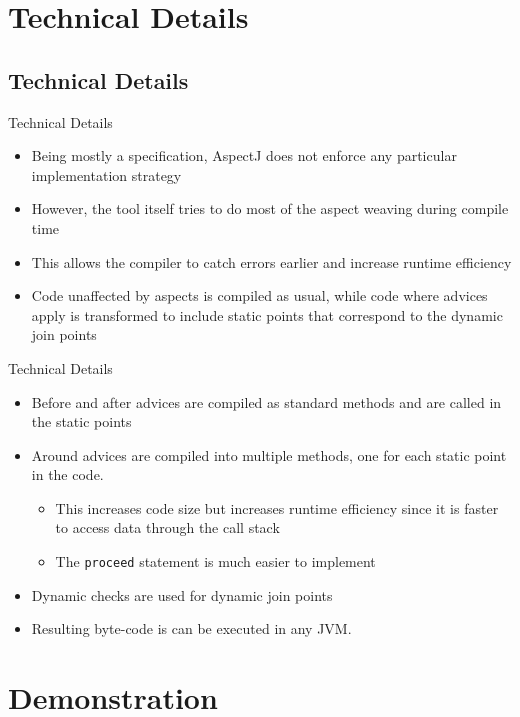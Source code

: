 \documentclass[11pt]{beamer}
\begin{document}
\section{Technical Details}
\subsection*{Technical Details}

\begin{frame}{Technical Details}
\begin{itemize}
   \item Being mostly a specification, AspectJ does not enforce any particular implementation strategy
   \item However, the tool itself tries to do most of the aspect weaving during compile time
   \item This allows the compiler to catch errors earlier and increase runtime efficiency
   \item Code unaffected by aspects is compiled as usual, while code where advices apply is transformed
   to include static points that correspond to the dynamic join points
\end{itemize}
\end{frame}

\begin{frame}{Technical Details}
\begin{itemize}
   \item Before and after advices are compiled as standard methods and are called in the static points
   \item Around advices are compiled into multiple methods, one for each static point in the code.
   \begin{itemize}
      \item This increases code size but increases runtime efficiency since it is faster to access data through the call stack
      \item The \texttt{proceed} statement is much easier to implement
   \end{itemize}
   \item Dynamic checks are used for dynamic join points
   \item Resulting byte-code is can be executed in any JVM.
\end{itemize}
\end{frame}

\section{Demonstration}
\end{document}
